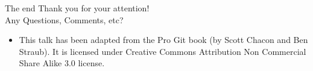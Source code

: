 \documentclass{beamer}
\begin{document}
    
    \begin{frame}{The end}
      {\huge
        Thank you for your attention!\\
        Any Questions, Comments, etc?
      }
      
      \begin{itemize}
        \item This talk has been adapted from the Pro Git book (by Scott Chacon and Ben Straub). It is licensed under Creative Commons Attribution Non Commercial Share Alike 3.0 license. 
      \end{itemize}
    \end{frame}
\end{document}

